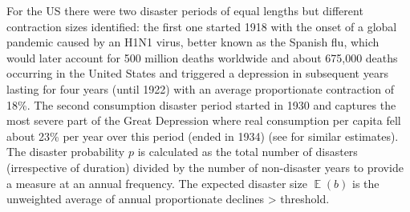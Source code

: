 {{{{For the US there were two disaster periods of equal lengths but different contraction sizes identified: the first one started 1918 with the onset of a global pandemic caused by an H1N1 virus, better known as the Spanish flu, which would later account for 500 million deaths worldwide and about 675,000 deaths occurring in the United States and triggered a depression in subsequent years lasting for four years (until 1922) with an average proportionate contraction of 18\%. The second consumption disaster period started in 1930 and captures the most severe part of the Great Depression where real consumption per capita fell about 23\% per year over this period (ended in 1934) (see \citet{Nakamura2013} for similar estimates).\\

The disaster probability $p$ is calculated as the total number of disasters (irrespective of duration) divided by the number of non-disaster years to provide a measure at an annual frequency. The expected disaster size $\mathop{\mathbb{E}}(b)$ is the unweighted average of annual proportionate declines > threshold.\\

}}}}
